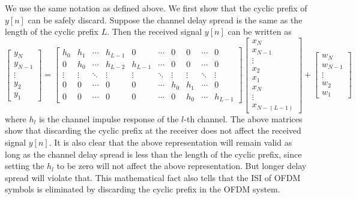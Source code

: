 We use the same notation as defined above. We first show that the cyclic prefix of $y[n]$ can be safely discard. Suppose the channel delay spread is the same as the length of the cyclic prefix $L$. Then the received signal $y[n]$ can be written as
\begin{equation}
    \label{eq:circ_conv}
    \begin{bmatrix}
        y_{N} \\ y_{N-1} \\ \vdots \\ y_2 \\ y_1
    \end{bmatrix}
    =
    \begin{bmatrix}
        h_0 & h_1 & \cdots & h_{L-1} & 0 & \cdots & 0 & 0 & \cdots & 0 \\
        0 & h_0 & \cdots & h_{L-2} & h_{L-1} & \cdots & 0 & 0 & \cdots & 0 \\
        \vdots & \vdots & \ddots & \vdots & \vdots & \ddots & \vdots & \vdots & \ddots & \vdots \\
        0 & 0 & \cdots & 0 & 0 & \cdots & h_0 & h_1 & \cdots & 0 \\
        0 & 0 & \cdots & 0 & 0 & \cdots & 0 & h_0 & \cdots & h_{L-1}
    \end{bmatrix}
    \begin{bmatrix}
        x_{N} \\ x_{N-1} \\ \vdots \\ x_2 \\ x_1 \\ x_{N} \\ \vdots \\ x_{N-(L-1)}
    \end{bmatrix}
    +
    \begin{bmatrix}
        w_{N} \\ w_{N-1} \\ \vdots \\ w_2 \\ w_1
    \end{bmatrix}
\end{equation}
where $h_l$ is the channel impulse response of the $l$-th channel. The above matrices show that discarding the cyclic prefix at the receiver does not affect the received signal $y[n]$. It is also clear that the above representation will remain valid as long as the channel delay spread is less than the length of the cyclic prefix, since setting the $h_l$ to be zero will not affect the above representation. But longer delay spread will violate that. This mathematical fact also tells that the ISI of OFDM symbols is eliminated by discarding the cyclic prefix in the OFDM system.

